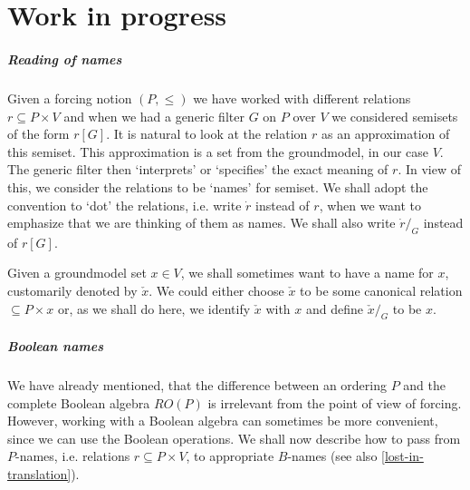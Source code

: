 \cfoot{}\rhead{\thepage}

%


\thispagestyle{empty}

\section{Work in progress}\label{work-in-progress}
\subparagraph{Reading of names} Given a forcing notion $(P,\leq)$ we have worked with different
relations $r\subseteq P\times V$ and when we had a generic filter $G$ on $P$ over $V$ we
considered semisets of the form $r[G]$. It is natural to look at the relation $r$ as an
approximation of this semiset. This approximation is a set from the groundmodel, in our case $V$.
The generic filter then `interprets' or `specifies' the exact meaning of $r$. In view of this,
we consider the relations to be `names' for semiset. We shall adopt the convention to `dot'
the relations, i.e. write $\dot{r}$ instead of $r$, when we want to emphasize that we are thinking
of them as names. We shall also write $\dot{r}/_G$ instead of $r[G]$.

Given a groundmodel set $x\in V$, we shall sometimes want to have a name for $x$, customarily
denoted by $\check{x}$. We could either choose $\check{x}$ to be some canonical relation
$\subseteq P\times x$ or, as we shall do here, we identify $\check{x}$ with $x$ and define
$\check{x}/_G$ to be $x$.

\subparagraph{Boolean names} \label{first-translation}
We have already mentioned, that the difference between an ordering $P$ and the complete Boolean
algebra $RO(P)$ is irrelevant from the point of view of forcing. However, working with a Boolean
algebra can sometimes be more convenient, since we can use the Boolean operations. We shall now
describe how to pass from $P$-names, i.e. relations $r\subseteq P\times V$, to appropriate
$B$-names (see also \ref{lost-in-translation}).

